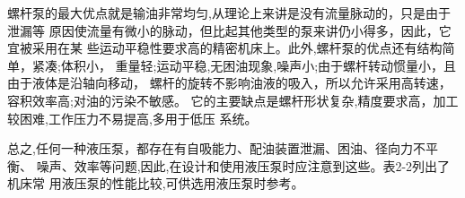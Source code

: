 螺杆泵的最大优点就是输油非常均匀,从理论上来讲是没有流量脉动的，只是由于泄漏等
原因使流量有微小的脉动，但比起其他类型的泵来讲仍小得多，因此，它宜被采用在某
些运动平稳性要求高的精密机床上。此外,螺杆泵的优点还有结构简单，紧凑;体积小，
重量轻;运动平稳,无困油现象,噪声小;由于螺杆转动惯量小，且由于液体是沿轴向移动，
螺杆的旋转不影响油液的吸入，所以允许采用高转速，容积效率高;对油的污染不敏感。
它的主要缺点是螺杆形状复杂,精度要求高，加工较困难,工作压力不易提高,多用于低压
系统。

总之,任何一种液压泵，都存在有自吸能力、配油装置泄漏、困油、径向力不平衡、
噪声、效率等问题,因此,在设计和使用液压泵时应注意到这些。表2-2列出了机床常
用液压泵的性能比较,可供选用液压泵时参考。
